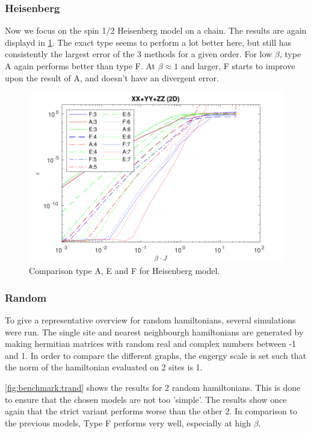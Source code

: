 \subsubsection{Heisenberg}

Now we focus on the spin 1/2 Heisenberg model on a chain. The results are again displayd in \cref{fig:benchmark:tHeisenberg}. The exact type seems to perform a lot better here, but still has consistently the largest error of the 3 methods for a given order. For low $\beta$, type A again performs better than type F. At $\beta \approx 1$ and larger, F starts to improve upon the result of A, and doesn't have an divergent error.

\begin{figure}
    \center
    \includegraphics[width=\textwidth]{Figuren/benchmarking/t_heis_XXX.pdf}
    \caption{Comparison type A, E and F for Heisenberg model.}
    \label{fig:benchmark:tHeisenberg}
\end{figure}

\subsubsection{Random}

To give a representative overview for random hamiltonians, several simulations were run. The single site and nearest neighbourgh hamiltonians are generated by making hermitian matrices with random real and complex numbers between -1 and 1. In order to compare the different graphs, the engergy scale is set such that the norm of the hamiltonian evaluated on 2 sites is 1.

\cref{fig:benchmark:trand} shows the results for 2 random hamiltonians. This is done to ensure that the chosen models are not too 'simple'. The results show once again that the strict variant performs worse than the other 2. In comparison to the previous models, Type F performs very well, especially at high $\beta$.

